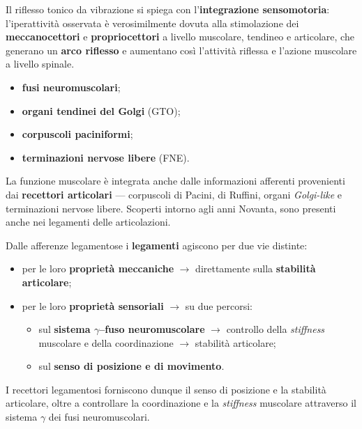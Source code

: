 Il riflesso tonico da vibrazione si spiega con l'\textbf{integrazione sensomotoria}: l'iperattività
osservata è verosimilmente dovuta alla stimolazione dei \textbf{meccanocettori} e
\textbf{propriocettori} a livello muscolare, tendineo e articolare, che generano un \textbf{arco
riflesso} e aumentano così l'attività riflessa e l'azione muscolare a livello spinale.

\begin{itemize}
  \item \textbf{fusi neuromuscolari};
  \item \textbf{organi tendinei del Golgi} (GTO);
  \item \textbf{corpuscoli paciniformi};
  \item \textbf{terminazioni nervose libere} (FNE).
\end{itemize}

La funzione muscolare è integrata anche dalle informazioni afferenti provenienti dai
\textbf{recettori articolari} --- corpuscoli di Pacini, di Ruffini, organi \textit{Golgi-like} e
terminazioni nervose libere. Scoperti intorno agli anni Novanta, sono presenti anche nei legamenti
delle articolazioni.

Dalle afferenze legamentose i \textbf{legamenti} agiscono per due vie distinte:
\begin{itemize}
  \item per le loro \textbf{proprietà meccaniche} $\rightarrow$ direttamente sulla \textbf{stabilità
    articolare};
  \item per le loro \textbf{proprietà sensoriali} $\rightarrow$ su due percorsi:
    \begin{itemize}
      \item sul \textbf{sistema $\gamma$--fuso neuromuscolare} $\rightarrow$ controllo della
        \textit{stiffness} muscolare e della coordinazione $\rightarrow$ stabilità articolare;
      \item sul \textbf{senso di posizione e di movimento}.
    \end{itemize}
\end{itemize}

I recettori legamentosi forniscono dunque il senso di posizione e la stabilità articolare, oltre a
controllare la coordinazione e la \textit{stiffness} muscolare attraverso il sistema $\gamma$ dei
fusi neuromuscolari.

